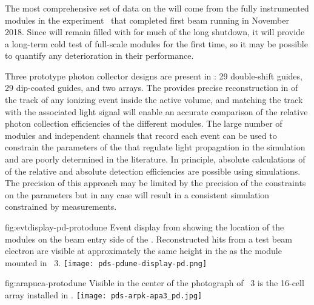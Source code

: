 \subsubsection{}
\label{sec:valid-pdsp}

The most comprehensive set of data on the  will come from the fully instrumented modules in the  experiment~\cite{Abi:2017aow} that completed first beam running in November \num{2018}. 
Since  will remain filled with  for much of the  long shutdown, it will provide a long-term cold test of full-scale  modules for the first time, so it may be possible to quantify any deterioration in their performance.

Three prototype photon collector designs are present in : \num{29} double-shift guides, \num{29} dip-coated guides, and two  arrays.
The  provides precise reconstruction in \threed of the track of any ionizing event inside the active volume, and matching the track with the associated light signal will enable an accurate comparison of the relative photon collection efficiencies of the different  modules. 
The large number of modules and independent channels that record each event can be used to constrain the parameters of the  that regulate  light propagation in the simulation and are poorly determined in the literature. %
In principle, absolute calculations of of the relative and absolute detection efficiencies are possible using  simulations.
The precision of this approach may be limited by the precision of the constraints on the parameters but in any case will result in a consistent simulation constrained by measurements. 


\begin{dunefigure}{fig:evtdisplay-pd-protodune}
{Event display from  showing the location of the  modules on the beam entry side of the . Reconstructed  hits from a test beam electron are visible at approximately the same height in the  as the  module mounted in ~3.} 
\texttt{[image: pds-pdune-display-pd.png]}
\end{dunefigure}

\begin{dunefigure}{fig:arapuca-protodune}
{Visible in the center of the photograph of ~3 is the 16-cell  array installed in .} 
\texttt{[image: pds-arpk-apa3\_pd.jpg]} 
\end{dunefigure}

